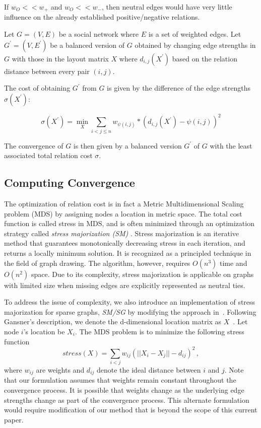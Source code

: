 \documentclass[acmtweb]{acmsmall}
\begin{document}
If $w_{O} << w_{+}$ and $w_{O} << w_{-}$, then neutral edges would
have very little influence on the already established
positive/negative relations.

\begin{definition}
Let $G=(V,E)$ be a social network where $E$ is a set of
  weighted edges. Let $G^{'}=(V,E^{'})$ be a balanced version of $G$
  obtained by changing edge strengths in $G$ with those in the layout
  matrix $X$ where $d_{i,j}(X^{'})$ based on the relation distance
  between every pair $(i,j)$.  

The cost of obtaining $G^{'}$ from $G$ is given by the difference of
the edge strengths $\sigma(X^{'})$:

\[\sigma(X^{'})= \min_{X} \sum_{i<j \leq n}w_{\psi(i,j)}*(d_{i,j}(X^{'})-\psi{(i,j)})^2\]

The convergence of $G$ is then given by a balanced version $G^{'}$ of
$G$ with the least associated total relation cost $\sigma$.
\end{definition}

\subsection{Computing Convergence}
The optimization of relation cost is in fact a Metric Multidimensional
Scaling problem (MDS) by assigning nodes a location in metric
space. The total cost function is called stress in MDS, and is often
minimized through an optimization strategy called {\it stress
  majorization (SM)} \cite {Gansner:05}. Stress majorization is an
iterative method that guarantees monotonically decreasing stress in
each iteration, and returns a locally minimum solution.  It is
recognized as a principled technique in the field of graph
drawing. The algorithm, however, requires $O(n^3)$ time and $O(n^{2})$
space. Due to its complexity, stress majorization is applicable on
graphs with limited size when missing edges are explicitly represented
as neutral ties. 

To address the issue of complexity, we also introduce an
implementation of stress majorization for sparse graphs, {\em SM/SG}
by modifying the approach in~\cite{Gansner:05}. Following Gansner's
description, we denote the d-dimensional location matrix as
$X$~\cite{Gansner:05}. Let node $i$'s location be $X_{i}$. The MDS
problem is to minimize the following stress function
\begin{equation}\label{stress}
stress(X)=\sum_{i<j} w_{ij} (||X_{i}-X_{j}|| - d_{ij})^{2}\,,
\end{equation}
where $w_{ij}$ are weights and $d_{ij}$ denote the ideal distance
between $i$ and $j$. Note that our formulation assumes that weights
remain constant throughout the convergence process. It is possible
that weights change as the underlying edge strengths change as part of
the convergence process. This alternate formulation would require
modification of our method that is beyond the scope of this current
paper.
\end{document}

